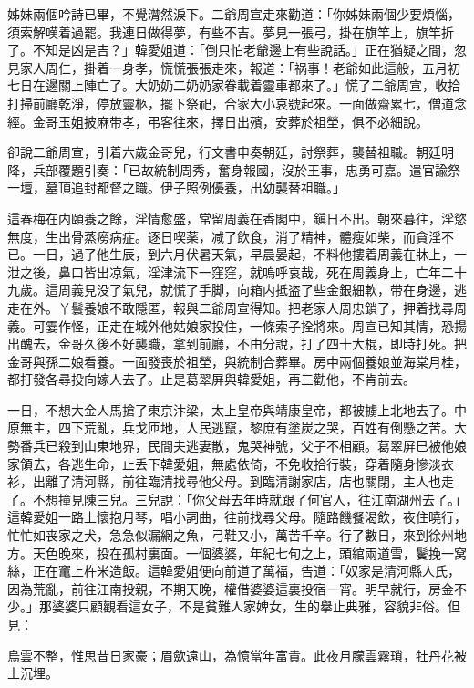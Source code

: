 姊妹兩個吟詩已畢，不覺潸然淚下。二爺周宣走來勸道：「你姊妹兩個少要煩惱，須索解嘆着過罷。我連日做得夢，有些不吉。夢見一張弓，掛在旗竿上，旗竿折了。不知是凶是吉？」韓愛姐道：「倒只怕老爺邊上有些說話。」正在猶疑之間，忽見家人周仁，掛着一身孝，慌慌張張走來，報道：「祸事！老爺如此這般，五月初七日在邊關上陣亡了。大奶奶二奶奶家眷載着靈車都來了。」慌了二爺周宣，收拾打掃前廳乾淨，停放靈柩，擺下祭祀，合家大小哀號起來。一面做齋累七，僧道念經。金哥玉姐披麻带孝，弔客往來，擇日出殯，安葬於祖塋，俱不必細說。

卻說二爺周宣，引着六歲金哥兒，行文書申奏朝廷，討祭葬，襲替祖職。朝廷明降，兵部覆題引奏：「已故統制周秀，奮身報國，沒於王事，忠勇可嘉。遣官諭祭一壇，墓頂追封都督之職。伊子照例優養，出幼襲替祖職。」

這春梅在内頤養之餘，淫情愈盛，常留周義在香閣中，鎭日不出。朝來暮往，淫慾無度，生出骨蒸癆病症。逐日喫薬，减了飲食，消了精神，體瘦如柴，而貪淫不已。一日，過了他生辰，到六月伏暑天氣，早晨晏起，不料他摟着周義在牀上，一泄之後，鼻口皆出凉氣，淫津流下一窪窪，就嗚呼哀哉，死在周義身上，亡年二十九歲。這周義見没了氣兒，就慌了手脚，向箱内抵盗了些金銀細軟，带在身邊，逃走在外。丫鬟養娘不敢隱匿，報與二爺周宣得知。把老家人周忠鎖了，押着找尋周義。可霎作怪，正走在城外他姑娘家投住，一條索子拴將來。周宣已知其情，恐揚出醜去，金哥久後不好襲職，拿到前廳，不由分說，打了四十大棍，即時打死。把金哥與孫二娘看養。一面發喪於祖塋，與統制合葬畢。房中兩個養娘並海棠月桂，都打發各尋投向嫁人去了。止是葛翠屏與韓愛姐，再三勸他，不肯前去。

一日，不想大金人馬搶了東京汴梁，太上皇帝與靖康皇帝，都被擄上北地去了。中原無主，四下荒亂，兵戈匝地，人民逃竄，黎庶有塗炭之哭，百姓有倒懸之苦。大勢番兵已殺到山東地界，民間夫逃妻散，鬼哭神號，父子不相顧。葛翠屏巳被他娘家領去，各逃生命，止丢下韓愛姐，無處依倚，不免收拾行裝，穿着隨身慘淡衣衫，出離了清河縣，前往臨清找尋他父母。到臨清謝家店，店也關閉，主人也走了。不想撞見陳三兒。三兒說：「你父母去年時就跟了何官人，往江南湖州去了。」這韓愛姐一路上懷抱月琴，唱小詞曲，往前找尋父母。隨路饑餐渴飲，夜住曉行，忙忙如丧家之犬，急急似漏網之魚，弓鞋又小，萬苦千辛。行了數日，來到徐州地方。天色晚來，投在孤村裏面。一個婆婆，年紀七旬之上，頭綰兩道雪，鬢挽一窝絲，正在竃上杵米造飯。這韓愛姐便向前道了萬福，告道：「奴家是清河縣人氏，因為荒亂，前往江南投親，不期天晚，權借婆婆這裏投宿一宵。明早就行，房金不少。」那婆婆只顧觀看這女子，不是貧難人家婢女，生的擧止典雅，容貌非俗。但見：
\begin{myquote}
烏雲不整，惟思昔日家豪；眉歛遠山，為憶當年富貴。此夜月朦雲霧瑣，牡丹花被土沉埋。
\end{myquote}

